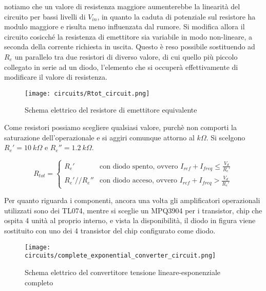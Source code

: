 notiamo che un valore di resistenza maggiore aumenterebbe la linearità del circuito per bassi
livelli di $V_{in}$, in quanto la caduta di potenziale sul resistore ha modulo maggiore e
risulta meno influenzata dal rumore. Si modifica allora il circuito cosicché la resistenza
di emettitore sia variabile in modo non-lineare, a seconda della corrente richiesta in uscita.
Questo è reso possibile sostituendo ad $R_e$ un parallelo tra due resistori di diverso valore,
di cui quello più piccolo collegato in serie ad un diodo, l'elemento che si occuperà
effettivamente di modificare il valore di resistenza.

\begin{figure}[H]
    \centering
    \texttt{[image: circuits/Rtot\_circuit.png]}
    \caption{Schema elettrico del resistore di emettitore equivalente}
    \label{Rtot_circuit}
\end{figure}

Come resistori possiamo scegliere qualsiasi valore, purchè non comporti la saturazione
dell'operazionale e si aggiri comunque attorno al $k\Omega$. Si scelgono $R_e'=10\ k\Omega$
e $R_e''=1.2\ k\Omega$.

\begin{equation}\label{rtot}
    R_{tot} =
    \left\{
    \begin{array}{lr}
        R_e'        & \text{con diodo spento, ovvero } I_{ref}+I_{freq}\leq\frac{V_d}{R_e'} \\
        R_e'//R_e'' & \text{con diodo acceso, ovvero } I_{ref}+I_{freq}>\frac{V_d}{R_e'}
    \end{array}
    \right.
\end{equation}

Per quanto riguarda i componenti, ancora una volta gli amplificatori operazionali utilizzati
sono dei TL074, mentre si sceglie un MPQ3904 \cite{mpq3904} per i transistor, chip che
ospita 4 unità al proprio interno, e vista la disponibilità, il diodo in figura viene
sostituito con uno dei 4 transistor del chip configurato come diodo.

\begin{figure}[H]
    \centering
    \texttt{[image: circuits/complete\_exponential\_converter\_circuit.png]}
    \caption{Schema elettrico del convertitore tensione lineare-esponenziale completo}
    \label{complete_exponential_converter_circuit}
\end{figure}


